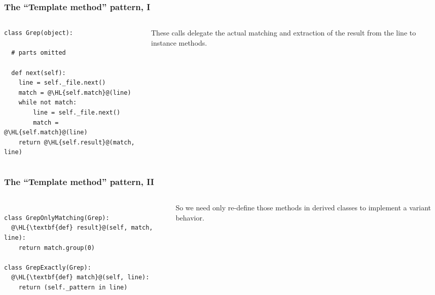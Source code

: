 \documentclass[english,serif,mathserif,xcolor=pdftex,dvipsnames,table]{beamer}
\begin{document}
\begin{frame}[fragile]
  \frametitle{The ``Template method'' pattern, I}
  \begin{columns}[t]
    \begin{column}{0.5\textwidth}
\begin{lstlisting}
class Grep(object):
  
  # parts omitted

  def next(self):
    line = self._file.next()
    match = @\HL{self.match}@(line)
    while not match:
        line = self._file.next()
        match = @\HL{self.match}@(line)
    return @\HL{self.result}@(match, line)
\end{lstlisting}
    \end{column}
    \begin{column}{0.5\textwidth}
      \raggedleft 
      These calls delegate the actual matching and
      extraction of the result from the line to instance methods.
    \end{column}
  \end{columns}
\end{frame}


\begin{frame}[fragile]
  \frametitle{The ``Template method'' pattern, II}
  \begin{columns}[t]
    \begin{column}{0.5\textwidth}
\begin{lstlisting}

class GrepOnlyMatching(Grep):
  @\HL{\textbf{def} result}@(self, match, line):
    return match.group(0)

class GrepExactly(Grep):
  @\HL{\textbf{def} match}@(self, line):
    return (self._pattern in line)
\end{lstlisting}
    \end{column}
    \begin{column}{0.5\textwidth}
      \raggedleft 
      So we need only re-define those methods in derived
      classes to implement a variant behavior.
    \end{column}
  \end{columns}
\end{frame}
\end{document}
